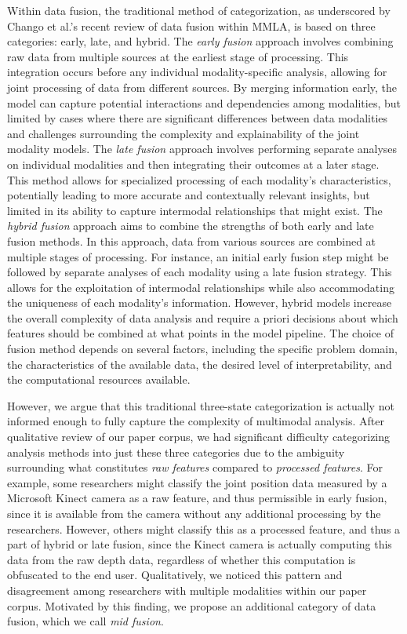 \documentclass[manuscript,screen,review]{acmart}
\begin{document}
Within data fusion, the traditional method of categorization, as underscored by Chango et al.’s \cite{Chango2022} recent review of data fusion within MMLA, is based on three categories: early, late, and hybrid. The \textit{early fusion} approach involves combining raw data from multiple sources at the earliest stage of processing. This integration occurs before any individual modality-specific analysis, allowing for joint processing of data from different sources. By merging information early, the model can capture potential interactions and dependencies among modalities, but limited by cases where there are significant differences between data modalities and challenges surrounding the complexity and explainability of the joint modality models. The \textit{late fusion} approach involves performing separate analyses on individual modalities and then integrating their outcomes at a later stage. This method allows for specialized processing of each modality's characteristics, potentially leading to more accurate and contextually relevant insights, but limited in its ability to capture intermodal relationships that might exist. The \textit{hybrid fusion} approach aims to combine the strengths of both early and late fusion methods. In this approach, data from various sources are combined at multiple stages of processing. For instance, an initial early fusion step might be followed by separate analyses of each modality using a late fusion strategy. This allows for the exploitation of intermodal relationships while also accommodating the uniqueness of each modality's information. However, hybrid models increase the overall complexity of data analysis and require a priori decisions about which features should be combined at what points in the model pipeline. The choice of fusion method depends on several factors, including the specific problem domain, the characteristics of the available data, the desired level of interpretability, and the computational resources available.

However, we argue that this traditional three-state categorization is actually not informed enough to fully capture the complexity of multimodal analysis. After qualitative review of our paper corpus, we had significant difficulty categorizing analysis methods into just these three categories due to the ambiguity surrounding what constitutes \textit{raw features} compared to \textit{processed features}. For example, some researchers might classify the joint position data measured by a Microsoft Kinect camera as a raw feature, and thus permissible in early fusion, since it is available from the camera without any additional processing by the researchers. However, others might classify this as a processed feature, and thus a part of hybrid or late fusion, since the Kinect camera is actually computing this data from the raw depth data, regardless of whether this computation is obfuscated to the end user. Qualitatively, we noticed this pattern and disagreement among researchers with multiple modalities within our paper corpus. Motivated by this finding, we propose an additional category of data fusion, which we call \textit{mid fusion}. 
\end{document}
